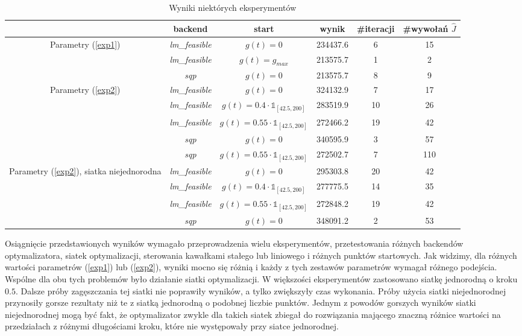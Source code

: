 \documentclass[11pt]{article}
\def\1{\mathds{1}}
\begin{document}
\begin{table}[h]
  \begin{center}
    \begin{tabular}{|c|c|c|c|c|c|}
      \hline
      & backend & start & wynik & \#iteracji & \#wywołań $\hat{J}$ \\
      \hline
      \multirow{3}{5em}{Parametry (\ref{exp1})} & {\it lm\_feasible\/} & $g(t) = 0$ & 234437.6 & 6 & 15 \\
      \cline{2-6}
      & {\it lm\_feasible\/} & $g(t) = g_{max}$ & 213575.7 & 1 & 2 \\
      \cline{2-6}
      & {\it sqp\/} & $g(t) = 0$ & 213575.7 & 8 & 9 \\
      \hline
      \multirow{5}{5em}{Parametry (\ref{exp2})} & {\it lm\_feasible\/} & $g(t) = 0$ & 324132.9 & 7 & 17 \\
      \cline{2-6}
      & {\it lm\_feasible\/} & $g(t) = 0.4\cdot\1_{[42.5,200]}$ & 283519.9 & 10 & 26 \\
      \cline{2-6}
      & {\it lm\_feasible\/} & $g(t) = 0.55\cdot\1_{[42.5,200]}$ & 272466.2 & 19 & 42 \\
      \cline{2-6}
      & {\it sqp\/} & $g(t) = 0$ & 340595.9 & 3 & 57 \\
      \cline{2-6}
      & {\it sqp\/} & $g(t) = 0.55\cdot\1_{[42.5,200]}$ & 272502.7 & 7 & 110 \\
      \hline
      \multirow{3}{6em}{Parametry (\ref{exp2}), siatka niejednorodna} & {\it lm\_feasible\/} & $g(t) = 0$ & 295303.8 & 20 & 42 \\
      \cline{2-6}
      & {\it lm\_feasible\/} & $g(t) = 0.4\cdot\1_{[42.5,200]}$ & 277775.5 & 14 & 35 \\
      \cline{2-6}
      & {\it lm\_feasible\/} & $g(t) = 0.55\cdot\1_{[42.5,200]}$ & 272848.2 & 19 & 42 \\
      \cline{2-6}
      & {\it sqp\/} & $g(t) = 0$ & 348091.2 & 2 & 53 \\
      \hline
    \end{tabular}
  \end{center}
  \caption{Wyniki niektórych eksperymentów}\label{resulttab}
\end{table}


Osiągnięcie przedstawionych wyników wymagało przeprowadzenia wielu eksperymentów, przetestowania różnych backendów optymalizatora, siatek optymalizacji, sterowania kawałkami stałego lub liniowego i różnych punktów startowych.
Jak widzimy, dla różnych wartości parametrów (\ref{exp1}) lub (\ref{exp2}), wyniki mocno się różnią i każdy z tych zestawów parametrów wymagał różnego podejścia. Wspólne dla obu tych problemów było działanie siatki optymalizacji. W większości eksperymentów zastosowano siatkę jednorodną o kroku $0.5$. Dalsze próby zagęszczania tej siatki nie poprawiły wyników, a tylko zwiększyły czas wykonania. Próby użycia siatki niejednorodnej przynosiły gorsze rezultaty niż te z siatką jednorodną o podobnej liczbie punktów. Jednym z powodów gorszych wyników siatki niejednorodnej mogą być fakt, że optymalizator zwykle dla takich siatek zbiegał do rozwiązania mającego znaczną różnice wartości na przedziałach z różnymi długościami kroku, które nie występowały przy siatce jednorodnej.
\end{document}
